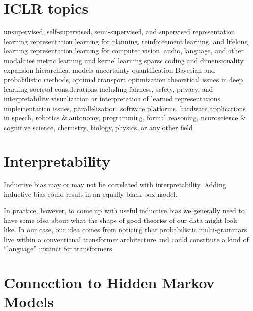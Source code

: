 \section{ICLR topics}


unsupervised, self-supervised, semi-supervised, and supervised representation learning
representation learning for planning, reinforcement learning, and lifelong learning
representation learning for computer vision, audio, language, and other modalities
metric learning and kernel learning
sparse coding and dimensionality expansion
hierarchical models
uncertainty quantification
Bayesian and probabilistic methods, optimal transport
optimization
theoretical issues in deep learning
societal considerations including fairness, safety, privacy, and interpretability
visualization or interpretation of learned representations
implementation issues, parallelization, software platforms, hardware
applications in speech, robotics & autonomy, programming, formal reasoning, neuroscience & cognitive science, chemistry, biology, physics, or any other field


\section{Interpretability}

Inductive bias may or may not be correlated with interpretability.  Adding inductive bias could result in an equally black box model.

In practice, however, to come up with useful inductive bias we generally need to have some idea about what the shape of good theories of our data might look like.  In our case, our idea comes from noticing that probabilistic multi-grammars live within a conventional transformer architecture and could constitute a kind of ``language'' instinct for transformers.

\section{Connection to Hidden Markov Models}



